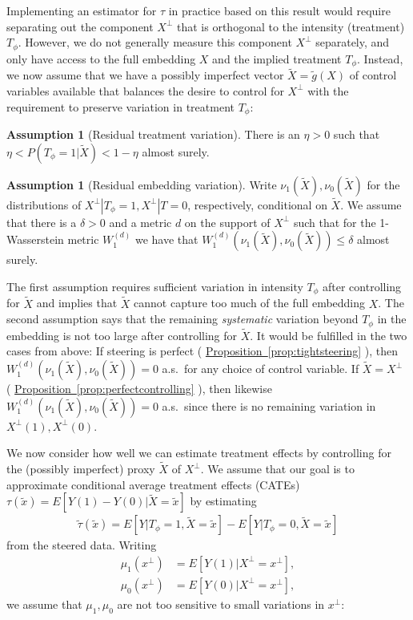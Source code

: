 \documentclass{article}
\theoremstyle{plain}
\theoremstyle{definition}
\newtheorem{assumption}[theorem]{Assumption}
\theoremstyle{remark}
\newcommand{\myref}[2]{%
    \hyperref[#2]{#1~\ref*{#2}}%
}
\begin{document}
Implementing an estimator for $\tau$ in practice based on this result would require separating out the component $X^\perp$ that is orthogonal to the intensity (treatment) $T_\phi$.
However, we do not generally measure this component $X^\perp$ separately, and only have access to the full embedding $X$ and the implied treatment $T_\phi$.
Instead, we now assume that we have a possibly imperfect vector $\tilde{X} = \tilde{g}(X)$ of control variables available that balances the desire to control for $X^\perp$ with the requirement to preserve variation in treatment $T_\phi$:
\vspace{5pt}
\begin{assumption}[Residual treatment variation]
\label{asm:residualtreatment}
    There is an $\eta > 0$ such that $\eta < P(T_\phi{=}1|\tilde{X}) < 1 - \eta$ almost surely.
\end{assumption}

\vspace{5pt}
\begin{assumption}[Residual embedding variation]
\label{asm:residualembedding}
    Write $\nu_1(\tilde{X}), \nu_0(\tilde{X})$ for the distributions of $X^\perp | T_\phi{=}1, X^\perp |T = 0$, respectively, conditional on $\tilde{X}$.
    We assume that there is a $\delta > 0$ and a metric $d$ on the support of $X^\perp$ such that
    for the 1-Wasserstein metric $W_1^{(d)}$
    we have that $W_1^{(d)}(\nu_1(\tilde{X}), \nu_0(\tilde{X})) \leq \delta$ almost surely.
\end{assumption}

The first assumption requires sufficient variation in intensity $T_\phi$ after controlling for $\tilde{X}$ and implies that $\tilde{X}$ cannot capture too much of the full embedding $X$.
The second assumption says that the remaining \emph{systematic} variation beyond $T_\phi$ in the embedding is not too large after controlling for $\tilde{X}$.
It would be fulfilled in the two cases from above:
If steering is perfect (\myref{Proposition}{prop:tightsteering}), then $W_1^{(d)}(\nu_1(\tilde{X}), \nu_0(\tilde{X})) = 0$ a.s.\ for any choice of control variable.
If $\tilde{X} = X^\perp$ (\myref{Proposition}{prop:perfectcontrolling}), then likewise $W_1^{(d)}(\nu_1(\tilde{X}), \nu_0(\tilde{X})) = 0$ a.s.\ since there is no remaining variation in $X^\perp(1), X^\perp(0)$.

We now consider how well we can estimate treatment effects by controlling for the (possibly imperfect) proxy $\tilde{X}$ of $X^\perp$.
We assume that our goal is to approximate conditional average treatment effects (CATEs) 
    $\tau(\tilde{x}) = E[Y(1) - Y(0)|\tilde{X} {=} \tilde{x}]$
by estimating
\begin{align}
\label{eqn:feasiblecate}
    \tilde{\tau}(\tilde{x}) = E[Y|T_\phi{=}1, \tilde{X} {=} \tilde{x}] - E[Y|T_\phi{=}0, \tilde{X} {=} \tilde{x}]
\end{align}
from the steered data.
Writing
\begin{align*}
    \mu_1(x^\perp) &= E[Y(1)|X^\perp {=} x^\perp],
    \\
    \mu_0(x^\perp) &= E[Y(0)|X^\perp {=} x^\perp],
\end{align*}
we assume that $\mu_1, \mu_0$ are not too sensitive to small variations in $x^\perp$:
\end{document}
